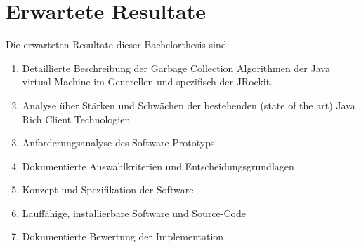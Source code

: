 \section{Erwartete Resultate}
Die erwarteten Resultate dieser Bachelorthesis sind:
\begin{enumerate}
\item Detaillierte Beschreibung der Garbage Collection Algorithmen der Java virtual 
    Machine im Generellen und spezifisch der JRockit.
\item Analyse über Stärken und Schwächen der bestehenden (state of the art) Java 
    Rich Client Technologien
\item Anforderungsanalyse des Software Prototyps
\item Dokumentierte Auswahlkriterien und Entscheidungsgrundlagen
\item Konzept und Spezifikation der Software
\item Lauffähige, installierbare Software und Source-Code
\item Dokumentierte Bewertung der Implementation
\end{enumerate}

